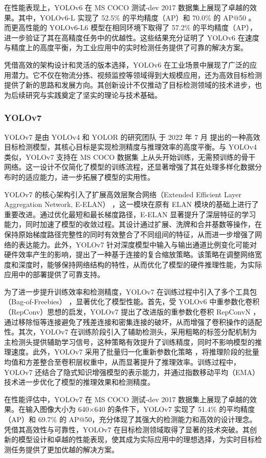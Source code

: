 \documentclass[11pt,twocolumn]{ctexart}
\begin{document}
在性能表现上，YOLOv6 在 MS COCO 测试-dev 2017 数据集上展现了卓越的效果。其中，YOLOv6-L 实现了 52.5\% 的平均精度（AP）和 70.0\% 的 AP@50 。而更高性能的 YOLOv6-L6 模型在相同环境下取得了 57.2\% 的平均精度（AP），进一步验证了其在高精度任务中的优越性。这些结果充分证明了 YOLOv6 在速度与精度上的高度平衡，为工业应用中的实时检测任务提供了可靠的解决方案。

凭借高效的架构设计和灵活的版本选择，YOLOv6 在工业场景中展现了广泛的应用潜力。它不仅在物流分拣、视频监控等领域得到大规模应用，还为高效目标检测提供了新的思路和发展方向。其创新设计不仅推动了目标检测领域的技术进步，也为后续研究与实践奠定了坚实的理论与技术基础。
\subsubsection{YOLOv7}
YOLOv7\cite{wang2023yolov7} 是由 YOLOv4 和 YOLOR 的研究团队 于 2022 年 7 月 提出的一种高效目标检测模型，其核心目标是实现检测精度与推理效率的高度平衡。与 YOLOv4 类似，YOLOv7 支持在 MS COCO 数据集 上从头开始训练，无需预训练的骨干网络。这一设计不仅简化了模型的训练流程，还显著增强了其在处理多样化数据分布时的适应能力，进一步拓展了模型的实用性。

YOLOv7 的核心架构引入了扩展高效层聚合网络（Extended Efficient Layer Aggregation Network, E-ELAN） ，这一模块在原有 ELAN 模块的基础上进行了重要改进。通过优化最短和最长梯度路径，E-ELAN 显著提升了深层特征的学习能力，同时加速了模型的收敛过程。其设计通过扩展、洗牌和合并基数等操作，在保持原始梯度路径完整性的同时有效整合了不同组间的特征，从而进一步增强了网络的表达能力。此外，YOLOv7 针对深度模型中输入与输出通道比例变化可能对硬件效率产生的影响，提出了一种基于连接的复合缩放策略。该策略在调整网络宽度和深度时，能够保持网络结构的特性，从而优化了模型的硬件推理性能，为实际应用中的部署提供了可靠支持。

为了进一步提升训练效率和检测精度，YOLOv7 在训练过程中引入了多个工具包（Bag-of-Freebies） ，显著优化了模型性能。首先，受 YOLOv6 中重参数化卷积（RepConv）思想的启发，YOLOv7 提出了改进版的重参数化卷积 RepConvN ，通过移除恒等连接避免了残差连接和密集连接的破坏，从而增强了卷积操作的适配性。其次，YOLOv7 在训练阶段引入了辅助检测头，采用粗略的标签分配机制为主检测头提供辅助学习信号，这种策略有效提升了训练精度，同时不影响模型的推理速度。此外，YOLOv7 采用了批量归一化重新参数化策略 ，将推理阶段的批量均值和方差整合至卷积层权重中，从而显著提升了推理效率。训练过程中，YOLOv7 还结合了隐式知识增强模型的表示能力，并通过指数移动平均（EMA）技术进一步优化了模型的推理效果和检测精度。

在性能评估中，YOLOv7 在 MS COCO 测试-dev 2017 数据集上展现了卓越的效果。在输入图像大小为 640×640 的条件下，YOLOv7 实现了 51.4\% 的平均精度（AP）和 69.7\% 的 AP@50，充分体现了其强大的检测能力和高效的设计理念。凭借其高效性与可靠性，YOLOv7 在目标检测领域取得了显著的技术突破。其创新的模型设计和卓越的性能表现，使其成为实际应用中的理想选择，为实时目标检测任务提供了更加优越的解决方案。
\end{document}
